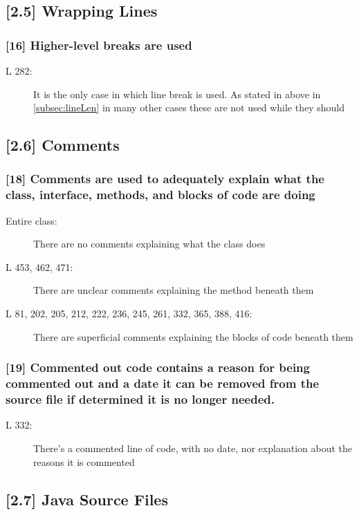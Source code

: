\subsection*{[2.5] Wrapping Lines}
\subsubsection*{[16] Higher-level breaks are used}
\begin{description}
	\item[L 282:] It is the only case in which line break is used. As stated in above in \autoref{subsec:lineLen} in many other cases these are not used while they should
\end{description}

\subsection*{[2.6] Comments}
\subsubsection*{[18] Comments are used to adequately explain what the class, interface, methods, and blocks of code are doing}
\begin{description}
	\item[Entire class:] There are no comments explaining what the class does
	\item[L 453, 462, 471:] There are unclear comments explaining the method beneath them
	\item[L 81, 202, 205, 212, 222, 236, 245, 261, 332, 365, 388, 416:] There are superficial comments explaining the blocks of code beneath them 
\end{description}

\subsubsection*{[19] Commented out code contains a reason for being commented out and a date it can be removed from the source file if determined it is no longer needed.}
\begin{description}
	\item[L 332:] There's a commented line of code, with no date, nor explanation about the reasons it is commented
\end{description}

\subsection*{[2.7] Java Source Files}

